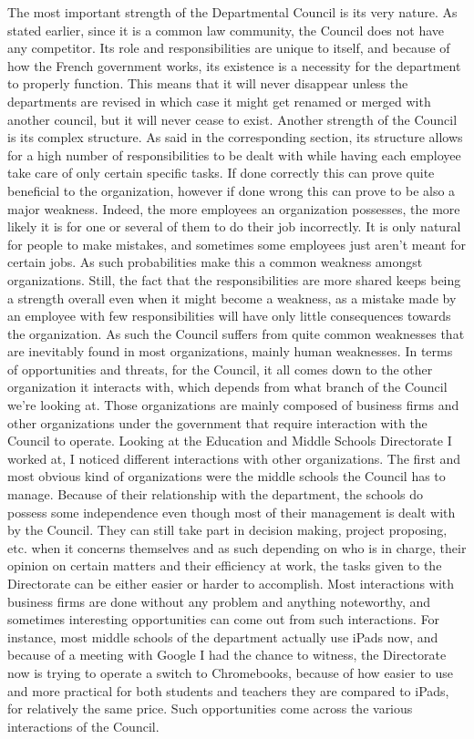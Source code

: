 \documentclass[12pt]{article}
\begin{document}
The most important strength of the Departmental Council is its very nature. As stated earlier, since it is a common law community, the Council does not have any competitor. Its role and responsibilities are unique to itself, and because of how the French government works, its existence is a necessity for the department to properly function. This means that it will never disappear unless the departments are revised in which case it might get renamed or merged with another council, but it will never cease to exist. Another strength of the Council is its complex structure. As said in the corresponding section, its structure allows for a high number of responsibilities to be dealt with while having each employee take care of only certain specific tasks. If done correctly this can prove quite beneficial to the organization, however if done wrong this can prove to be also a major weakness. Indeed, the more employees an organization possesses, the more likely it is for one or several of them to do their job incorrectly. It is only natural for people to make mistakes, and sometimes some employees just aren't meant for certain jobs. As such probabilities make this a common weakness amongst organizations. Still, the fact that the responsibilities are more shared keeps being a strength overall even when it might become a weakness, as a mistake made by an employee with few responsibilities will have only little consequences towards the organization. As such the Council suffers from quite common weaknesses that are inevitably found in most organizations, mainly human weaknesses. In terms of opportunities and threats, for the Council, it all comes down to the other organization it interacts with, which depends from what branch of the Council we're looking at. Those organizations are mainly composed of business firms and other organizations under the government that require interaction with the Council to operate. Looking at the Education and Middle Schools Directorate I worked at, I noticed different interactions with other organizations. The first and most obvious kind of organizations were the middle schools the Council has to manage. Because of their relationship with the department, the schools do possess some independence even though most of their management is dealt with by the Council. They can still take part in decision making, project proposing, etc. when it concerns themselves and as such depending on who is in charge, their opinion on certain matters and their efficiency at work, the tasks given to the Directorate can be either easier or harder to accomplish. Most interactions with business firms are done without any problem and anything noteworthy, and sometimes interesting opportunities can come out from such interactions. For instance, most middle schools of the department actually use iPads now, and because of a meeting with Google I had the chance to witness, the Directorate now is trying to operate a switch to Chromebooks, because of how easier to use and more practical for both students and teachers they are compared to iPads, for relatively the same price. Such opportunities come across the various interactions of the Council.
\end{document}
